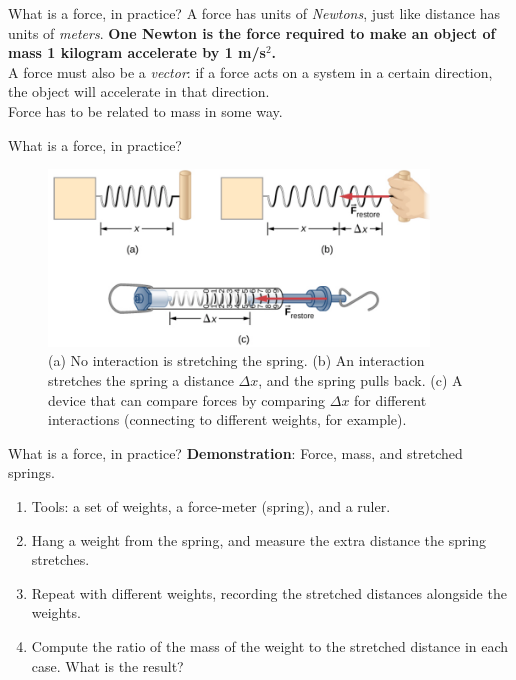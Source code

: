 \documentclass{beamer}
\begin{document}
\begin{frame}{What is a force, in practice?}
A force has units of \textit{Newtons}, just like distance has units of \textit{meters}.  \textbf{One Newton is the force required to make an object of mass 1 kilogram accelerate by 1 m/s$^2$.} \\
\vspace{1cm}
A force must also be a \textit{vector}: if a force acts on a system in a certain direction, the object will accelerate in that direction. \\
\vspace{1cm}
Force has to be related to mass in some way.
\end{frame}

\begin{frame}{What is a force, in practice?}
\small
\begin{figure}
\centering
\includegraphics[width=0.9\textwidth]{figures/force1.png}
\caption{\label{fig:force1} (a) No interaction is stretching the spring.  (b) An interaction stretches the spring a distance $\Delta x$, and the spring pulls back.  (c) A device that can compare forces by comparing $\Delta x$ for different interactions (connecting to different weights, for example).}
\end{figure}
\end{frame}

\begin{frame}{What is a force, in practice?}
\textbf{Demonstration}: Force, mass, and stretched springs.
\begin{enumerate}
\item Tools: a set of weights, a force-meter (spring), and a ruler.
\item Hang a weight from the spring, and measure the extra distance the spring stretches.
\item Repeat with different weights, recording the stretched distances alongside the weights.
\item Compute the ratio of the mass of the weight to the stretched distance in each case.  What is the result?
\end{enumerate}
\end{frame}
\end{document}
